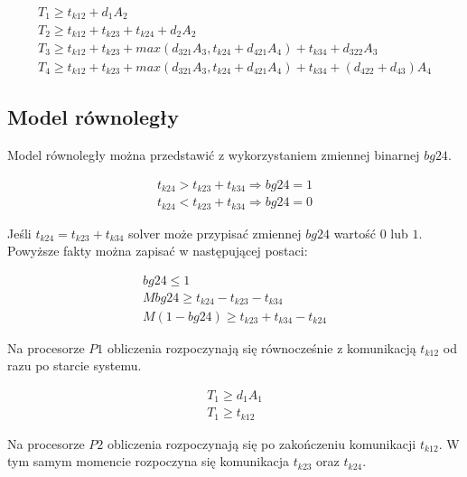\begin{equation} \label{eq:sek3}
\begin{array}{l}
T_{1} \geq t_{k12} + d_{1}A_{2} \\
T_{2} \geq t_{k12} + t_{k23} + t_{k24} + d_{2}A_{2} \\
T_{3} \geq t_{k12} + t_{k23} + max(d_{321}A_{3}, t_{k24} + d_{421}A_{4}) + t_{k34} + d_{322}A_{3} \\
T_{4} \geq t_{k12} + t_{k23} + max(d_{321}A_{3}, t_{k24} + d_{421}A_{4}) + t_{k34} + (d_{422} + d_{43})A_{4}
\end{array}
\end{equation}

\subsection{Model równoległy}

Model równoległy można przedstawić z wykorzystaniem zmiennej binarnej $bg24$.

\begin{equation} \label{eq:bg24}
\begin{array}{l}
t_{k24} > t_{k23} + t_{k34} \Rightarrow bg24 = 1 \\
t_{k24} < t_{k23} + t_{k34} \Rightarrow bg24 = 0
\end{array}
\end{equation}

Jeśli $t_{k24} = t_{k23} + t_{k34}$ solver może przypisać zmiennej $bg24$ wartość $0$ lub $1$.
Powyższe fakty można zapisać w następującej postaci:

\begin{equation}
\begin{array}{l}
bg24 \leq 1 \\
Mbg24 \geq t_{k24} - t_{k23} - t_{k34} \\
M(1 - bg24) \geq t_{k23} + t_{k34} - t_{k24}
\end{array}
\end{equation}

Na procesorze $P1$ obliczenia rozpoczynają się równocześnie z komunikacją $t_{k12}$ od razu po starcie systemu.

\begin{equation}
\begin{array}{l}
T_{1} \geq d_{1}A_{1} \\
T_{1} \geq t_{k12}
\end{array}
\end{equation}

Na procesorze $P2$ obliczenia rozpoczynają się po zakończeniu komunikacji $t_{k12}$.
W tym samym momencie rozpoczyna się komunikacja $t_{k23}$ oraz $t_{k24}$.

